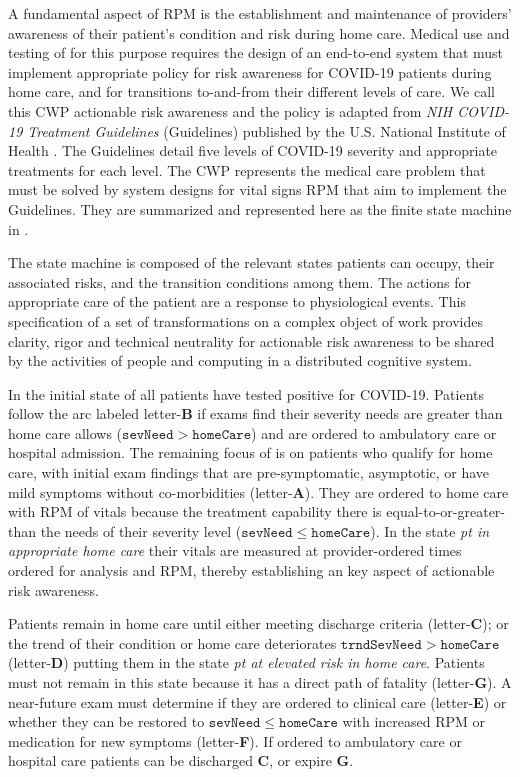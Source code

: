 A fundamental aspect of RPM is the establishment and maintenance of providers' awareness of their patient’s condition and risk during home care.
Medical use and testing of \phware for this purpose requires the design of an end-to-end system that must implement appropriate policy for risk awareness for COVID-19 patients during home care, and for transitions to-and-from their different levels of care.
We call this CWP actionable risk awareness and the policy is adapted from \emph{NIH COVID-19 Treatment Guidelines} (Guidelines) published by the U.S. National Institute of Health \cite{NIH}.
The Guidelines detail five levels of COVID-19 severity and appropriate treatments for each level.
The CWP represents the medical care problem that must be solved by system designs for vital signs RPM that aim to implement the Guidelines.
They are summarized and represented here as the finite state machine in .

The state machine is composed of the relevant states patients can occupy, their associated risks, and the transition conditions among them. The actions for appropriate care of the patient are a response to physiological events. This specification of a set of transformations on a complex object of work provides clarity, rigor and technical neutrality for actionable risk awareness to be shared by the activities of people and computing in a distributed cognitive system.

In the initial state of  all patients have tested positive for COVID-19. Patients follow the arc labeled letter-\textbf{B} if exams find their severity needs are greater than home care allows ($\mathtt{sevNeed} > \mathtt{homeCare}$) and are ordered to ambulatory care or hospital admission.
The remaining focus of  is on patients who qualify for home care, with initial exam findings that are pre-symptomatic, asymptotic, or have mild symptoms without co-morbidities (letter-\textbf{A}).
They are ordered to home care with RPM of vitals because the treatment capability there is equal-to-or-greater-than the needs of their severity level ($\mathtt{sevNeed} \le \mathtt{homeCare}$).
In the state \emph{pt in appropriate home care} their vitals are measured at provider-ordered times ordered for analysis and RPM, thereby establishing an key aspect of actionable risk awareness.

Patients remain in home care until either meeting discharge criteria (letter-\textbf{C}); or the trend of their condition or home care deteriorates $\mathtt{trndSevNeed} > \mathtt{homeCare}$ (letter-\textbf{D}) putting them in the state \emph{pt at elevated risk in home care}.
Patients must not remain in this state because it has a direct path of fatality (letter-\textbf{G}).
A near-future exam must determine if they are ordered to clinical care (letter-\textbf{E}) or whether they can be restored to $\mathtt{sevNeed} \le \mathtt{homeCare}$ with increased RPM or medication for new symptoms (letter-\textbf{F}).
If ordered to ambulatory care or hospital care patients can be discharged \textbf{C}, or expire \textbf{G}.

